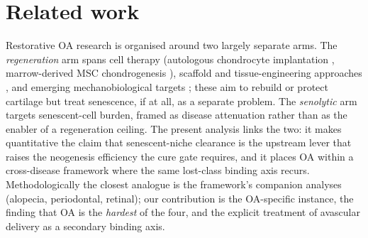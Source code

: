 \documentclass[11pt,a4paper]{article}
\begin{document}
\section{Related work}
\label{sec:related}
Restorative OA research is organised around two largely separate arms. The
\emph{regeneration} arm spans cell therapy (autologous chondrocyte implantation
\citep{brittberg1994}, marrow-derived MSC chondrogenesis \citep{johnstone1998}), scaffold
and tissue-engineering approaches \citep{makris2015}, and emerging mechanobiological
targets \citep{hodgkinson2022}; these aim to rebuild or protect cartilage but treat
senescence, if at all, as a separate problem. The \emph{senolytic} arm
\citep{jeon2017,xu2018,zhu2015} targets senescent-cell burden, framed as disease
attenuation rather than as the enabler of a regeneration ceiling. The present analysis
links the two: it makes quantitative the claim that senescent-niche clearance is the
upstream lever that raises the neogenesis efficiency the cure gate requires, and it
places OA within a cross-disease framework where the same lost-class binding axis recurs.
Methodologically the closest analogue is the framework's companion analyses (alopecia,
periodontal, retinal); our contribution is the OA-specific instance, the finding that OA
is the \emph{hardest} of the four, and the explicit treatment of avascular delivery as a
secondary binding axis.
\end{document}
